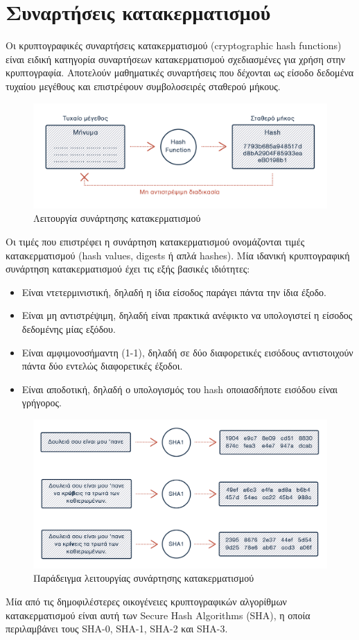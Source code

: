 \section{Συναρτήσεις κατακερματισμού} \label{section:2-1-hash-functions}

Οι κρυπτογραφικές συναρτήσεις κατακερματισμού (cryptographic hash functions) είναι ειδική κατηγορία συναρτήσεων κατακερματισμού σχεδιασμένες για χρήση στην κρυπτογραφία. Αποτελούν μαθηματικές συναρτήσεις που δέχονται ως είσοδο δεδομένα τυχαίου μεγέθους και επιστρέφουν συμβολοσειρές σταθερού μήκους.

\begin{figure}[H]
	\centering
	\includegraphics[width=.9\textwidth]{assets/figures/chapter-2/2.1.hash-functions-1.png}
	\caption{Λειτουργία συνάρτησης κατακερματισμού}
\end{figure}

Οι τιμές που επιστρέφει η συνάρτηση κατακερματισμού ονομάζονται τιμές κατακερματισμού (hash values, digests ή απλά hashes). Μία ιδανική κρυπτογραφική συνάρτηση κατακερματισμού έχει τις εξής βασικές ιδιότητες:

\begin{itemize}
	\item Είναι ντετερμινιστική, δηλαδή η ίδια είσοδος παράγει πάντα την ίδια έξοδο.
	\item Είναι μη αντιστρέψιμη, δηλαδή είναι πρακτικά ανέφικτο να υπολογιστεί η είσοδος δεδομένης μίας εξόδου.
	\item Είναι αμφιμονοσήμαντη (1-1), δηλαδή σε δύο διαφορετικές εισόδους αντιστοιχούν πάντα δύο εντελώς διαφορετικές έξοδοι.
	\item Είναι αποδοτική, δηλαδή ο υπολογισμός του hash οποιασδήποτε εισόδου είναι γρήγορος.
\end{itemize}

\begin{figure}[H]
	\centering
	\includegraphics[width=.9\textwidth]{assets/figures/chapter-2/2.1.hash-functions-2.png}
	\caption{Παράδειγμα λειτουργίας συνάρτησης κατακερματισμού}
\end{figure}

Μία από τις δημοφιλέστερες οικογένειες κρυπτογραφικών αλγορίθμων κατακερματισμού είναι αυτή των Secure Hash Algorithms (SHA), η οποία περιλαμβάνει τους SHA-0, SHA-1, SHA-2 και SHA-3.